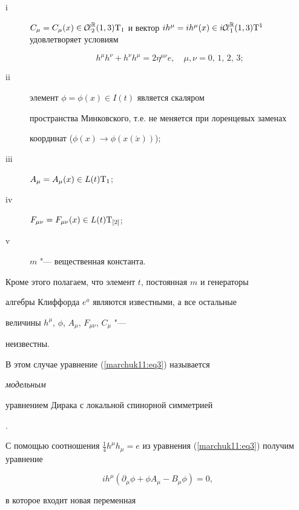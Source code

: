 \begin{description}

\item[i] $C_\mu=C_\mu(x)\in{\mathcal{C\!\ell}}_2^{\mathbb R}(1, 3){\rm T}_1$ и вектор $i h^\mu=i

h^\mu(x)\in i{\mathcal{C\!\ell}}_1^{\mathbb R}(1, 3){\rm T}^1$ удовлетворяет условиям

\begin{equation}

\label{marchuk11:eq4}

h^\mu h^\nu+h^\nu h^\mu=2\eta^{\mu\nu}e, \quad \mu, \nu=0, \,1, \,2, \,3;

\end{equation}

\item[ii] элемент $\phi=\phi(x)\in I(t)$ является скаляром

пространства Минковского,  т.е. не меняется при лоренцевых заменах

координат ($\phi(x)\to\phi(x(\acute x))$);

\item[iii] $A_\mu=A_\mu(x)\in L(t){\rm T}_1$;

\item[iv] $F_{\mu\nu}=F_{\mu\nu}(x)\in L(t){\rm T}_{[2]}$;

\item [v] $m$ "--- вещественная константа.

\end{description}

Кроме этого полагаем,  что элемент $t$,  постоянная $m$ и генераторы

алгебры Клиффорда $e^a$ являются известными,  а все остальные

величины $h^\mu$,  $\phi$,  $A_\mu$,  $F_{\mu\nu}$,  $C_\mu$ "---

неизвестны.



В этом случае уравнение (\ref{marchuk11:eq3}) называется {\em модельным

уравнением Дирака с локальной спинорной симметрией}.



С помощью соотношения $\frac{1}{4}h^\mu h_\mu=e$ из уравнения (\ref{marchuk11:eq3}) получим уравнение

$$

i h^\mu(\partial_\mu\phi+\phi A_\mu-B_\mu\phi)=0, 

$$

в которое входит новая переменная

